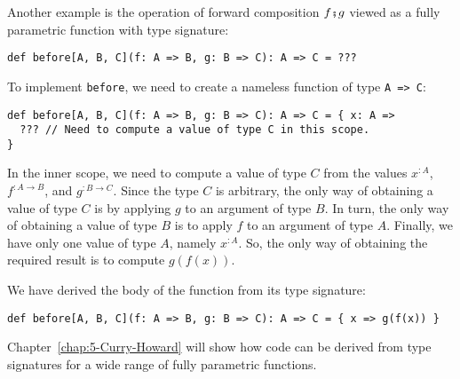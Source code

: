 Another example is the operation of forward composition $f\bef g$
viewed as a fully parametric function with type signature:
\begin{lstlisting}
def before[A, B, C](f: A => B, g: B => C): A => C = ???
\end{lstlisting}
To implement \lstinline!before!, we need to create a nameless function
of type \lstinline!A => C!:
\begin{lstlisting}
def before[A, B, C](f: A => B, g: B => C): A => C = { x: A =>
  ??? // Need to compute a value of type C in this scope.
}
\end{lstlisting}
In the inner scope, we need to compute a value of type $C$ from the
values $x^{:A}$, $f^{:A\rightarrow B}$, and $g^{:B\rightarrow C}$.
Since the type $C$ is arbitrary, the only way of obtaining a value
of type $C$ is by applying $g$ to an argument of type $B$. In turn,
the only way of obtaining a value of type $B$ is to apply $f$ to
an argument of type $A$. Finally, we have only one value of type
$A$, namely $x^{:A}$. So, the only way of obtaining the required
result is to compute $g(f(x))$.

We have derived the body of the function from its type signature:
\begin{lstlisting}
def before[A, B, C](f: A => B, g: B => C): A => C = { x => g(f(x)) }
\end{lstlisting}

Chapter~\ref{chap:5-Curry-Howard} will show how code can be derived
from type signatures for a wide range of fully parametric functions.
